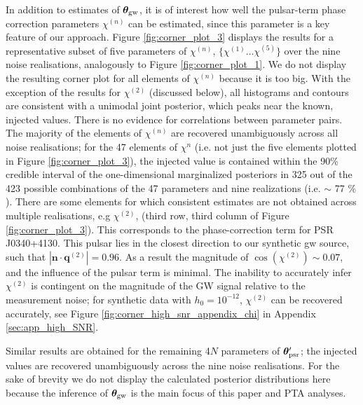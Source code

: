 \documentclass[fleqn,usenatbib,useAMS]{mnras}
\begin{document}
 
In addition to estimates of $\boldsymbol{\theta}_{\rm gw}$, it is of interest how well the pulsar-term phase correction parameters $\chi^{(n)}$ can be estimated, since this parameter is a key feature of our approach. Figure \ref{fig:corner_plot_3} displays the results for a representative subset of five parameters of $\chi^{(n)}$, $ \{\chi^{(1)} \dots \chi^{(5)} \}$ over the nine noise realisations, analogously to Figure \ref{fig:corner_plot_1}. We do not display the resulting corner plot for all elements of $\chi^{(n)}$ because it is too big. With the exception of the results for $\chi^{(2)}$ (discussed below), all histograms and contours are consistent with a unimodal joint posterior, which peaks near the known, injected values. There is no evidence for correlations between parameter pairs. The majority of the elements of $\chi^{(n)}$ are recovered unambiguously across all noise realisations; for the 47 elements of $\chi^{n}$ (i.e. not just the five elements plotted in Figure \ref{fig:corner_plot_3}), the injected value is  contained within the 90\% credible interval of the one-dimensional marginalized posteriors in 325 out of the 423 possible combinations of the 47 parameters and nine realizations (i.e. $\sim$ 77 $\%$). There are some elements for which consistent estimates are not obtained across multiple realisations, e.g $\chi^{(2)}$, (third row, third column of Figure \ref{fig:corner_plot_3}). This corresponds to the phase-correction term for PSR J0340+4130. This pulsar lies in the closest direction to our synthetic gw source, such that $| \boldsymbol{n} \cdot \boldsymbol{q}^{(2)}| = 0.96$. As a result the magnitude of $\cos \left( \chi^{(2)}\right) \sim 0.07$, and the influence of the pulsar term is minimal. The inability to accurately infer $\chi^{(2)}$ is contingent on the magnitude of the GW signal relative to the measurement noise; for synthetic data with $h_0 = 10^{-12}$, $\chi^{(2)}$ can be recovered accurately, see Figure \ref{fig:corner_high_snr_appendix_chi} in Appendix \ref{sec:app_high_SNR}. \newline 

Similar results are obtained for the remaining 4$N$ parameters of $\boldsymbol{\theta}_{\rm psr}'$; the injected values are recovered unambiguously across the nine noise realisations. For the sake of brevity we do not display the calculated posterior distributions here because the inference of $\boldsymbol{\theta}_{\rm gw}$ is the main focus of this paper and PTA analyses. \newline 
\end{document}
